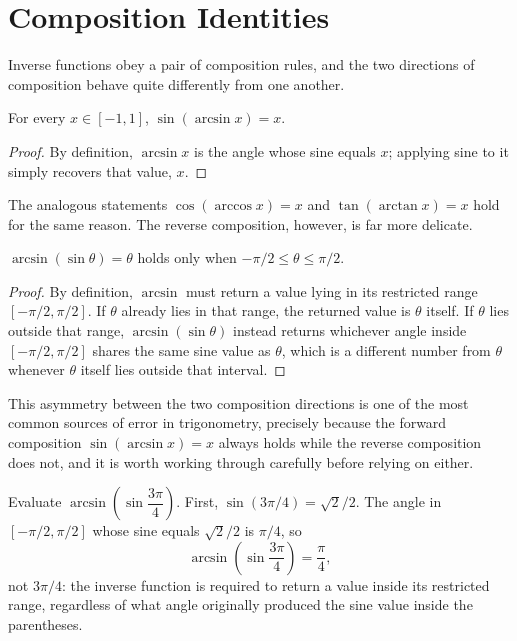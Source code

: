 \section{Composition Identities}

Inverse functions obey a pair of composition rules, and the two directions
of composition behave quite differently from one another.

\begin{theorem}
For every $x \in [-1,1]$, $\sin(\arcsin x) = x$.
\end{theorem}

\begin{proof}
By definition, $\arcsin x$ is the angle whose sine equals $x$; applying
sine to it simply recovers that value, $x$.
\end{proof}

The analogous statements $\cos(\arccos x) = x$ and $\tan(\arctan x) = x$
hold for the same reason. The reverse composition, however, is far more
delicate.

\begin{theorem}
$\arcsin(\sin\theta) = \theta$ holds only when $-\pi/2 \le \theta \le
\pi/2$.
\end{theorem}

\begin{proof}
By definition, $\arcsin$ must return a value lying in its restricted range
$\left[-\pi/2,\pi/2\right]$. If $\theta$ already lies in that range, the
returned value is $\theta$ itself. If $\theta$ lies outside that range,
$\arcsin(\sin\theta)$ instead returns whichever angle inside
$\left[-\pi/2,\pi/2\right]$ shares the same sine value as $\theta$, which is
a different number from $\theta$ whenever $\theta$ itself lies outside that
interval.
\end{proof}

This asymmetry between the two composition directions is one of the most
common sources of error in trigonometry, precisely because the forward
composition $\sin(\arcsin x) = x$ always holds while the reverse
composition does not, and it is worth working through carefully before
relying on either.

\begin{example}
Evaluate $\arcsin\left(\sin\dfrac{3\pi}{4}\right)$. First, $\sin(3\pi/4) =
\sqrt2/2$. The angle in $\left[-\pi/2,\pi/2\right]$ whose sine equals
$\sqrt2/2$ is $\pi/4$, so
\[
\arcsin\left(\sin\frac{3\pi}{4}\right) = \frac{\pi}{4},
\]
not $3\pi/4$: the inverse function is required to return a value inside its
restricted range, regardless of what angle originally produced the sine
value inside the parentheses.
\end{example}

